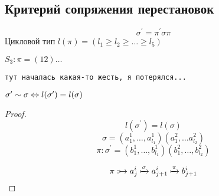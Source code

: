 \subsection{Критерий сопряжения перестановок}

\begin{example}
  \[\sigma^{\prime} = \pi^{\prime} \sigma \pi\]
  Цикловой тип $l(\pi) = (l_1 \geq l_2 \geq \dots \geq l_5)$
  
  $S_3: \pi = (12) \dots$
\end{example}
\begin{center}
  \texttt{тут началась какая-то жесть, я потерялся...}
\end{center}
\begin{theorem}
  $\sigma^{\prime} \sim \sigma \Leftrightarrow l(\sigma^{\prime}) = l(\sigma)$
\end{theorem}

\begin{proof}
  \[l(\sigma^{\prime}) = l(\sigma)\]
  \[\sigma = (a_1^1, \dots, a_{l_1}^1)(a_1^{2}, \dots a_{l_2}^2)\]
  \[\pi: \sigma^{\prime}  = (b_1^{1}, \dots , b_{l_1}^1)(b_1^2, \dots, b_{l_2}^2 )\]

  \[\pi: \mapsto a_j^i \xmapsto{\sigma} a_{j + 1}^i 
  \xmapsto{\pi} b_{j+1}^{i}\]
\end{proof}

